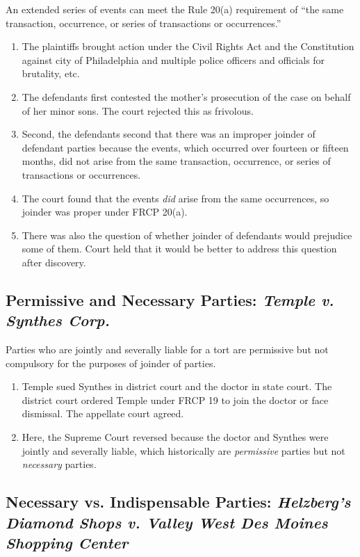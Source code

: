 An extended series of events can meet the Rule 20(a) requirement of ``the same 
transaction, occurrence, or series of transactions or occurrences.''

\begin{enumerate}
    \item The plaintiffs brought action under the Civil Rights Act and the 
    Constitution against city of Philadelphia and multiple police officers and 
    officials for brutality, etc.
    \item The defendants first contested the mother's prosecution of the case 
    on behalf of her minor sons. The court rejected this as frivolous.
    \item Second, the defendants second that there was an improper joinder of 
    defendant parties because the events, which occurred over fourteen or 
    fifteen months, did not arise from the same transaction, occurrence, or 
    series of transactions or occurrences.
    \item The court found that the events \emph{did} arise from the same 
    occurrences, so joinder was proper under FRCP 20(a).
    \item There was also the question of whether joinder of defendants would 
    prejudice some of them. Court held that it would be better to address this 
    question after discovery.
\end{enumerate}

\subsection{Permissive and Necessary Parties: \emph{Temple v. Synthes Corp.}}

Parties who are jointly and severally liable for a tort are permissive but not 
compulsory for the purposes of joinder of parties.

\begin{enumerate}
    \item Temple sued Synthes in district court and the doctor in state court. 
    The district court ordered Temple under FRCP 19 to join the doctor or face 
    dismissal. The appellate court agreed.
    \item Here, the Supreme Court reversed because the doctor and Synthes were 
    jointly and severally liable, which historically are \emph{permissive} 
    parties but not \emph{necessary} parties.
\end{enumerate}

\subsection{Necessary vs. Indispensable Parties: \emph{Helzberg's Diamond 
Shops v. Valley West Des Moines Shopping Center}}

